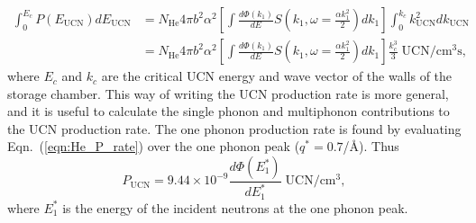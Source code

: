 \begin{equation}
\label{eqn:He_P_rate}
\begin{split}
\int _0 ^{E_c} P(E_{\text{UCN}})dE_{\text{UCN}} &= N_{\text{He}} 4 \pi b^2
\alpha^2 \left[ \int \frac{d\Phi(k_1)}{dE} S \left( k_1,
  \omega=\frac{\alpha k_1^2}{2} \right)dk_1 \right] \int_0^{k_c}
k_{\text{UCN}}^2dk_{\text{UCN}} \\ &=N_{\text{He}} 4 \pi b^2 \alpha^2 \left[
  \int \frac{d\Phi(k_1)}{dE} S \left( k_1, \omega=\frac{\alpha
    k_1^2}{2} \right) dk_1 \right] \frac{k_c^3}{3}\;
\text{UCN}/\text{cm}^3 \text{s},
\end{split}
\end{equation}
where $E_c$ and $k_c$ are the critical UCN energy and wave vector of
the walls of the storage chamber. This way of writing the UCN
production rate is more general, and it is useful to calculate the
single phonon and multiphonon contributions to the UCN production
rate. The one phonon production rate is found by evaluating
Eqn.~(\ref{eqn:He_P_rate}) over the one phonon peak ($q^*=0.7$/\AA).
Thus
\begin{equation}
P_{\text{UCN}}=9.44 \times 10^{-9}\frac{d\Phi (E_1^*)}{dE_1^*} \;
\text{UCN}/\text{cm}^3,
\end{equation}
 where $E_1^*$ is the energy of the incident neutrons at the one phonon peak.






